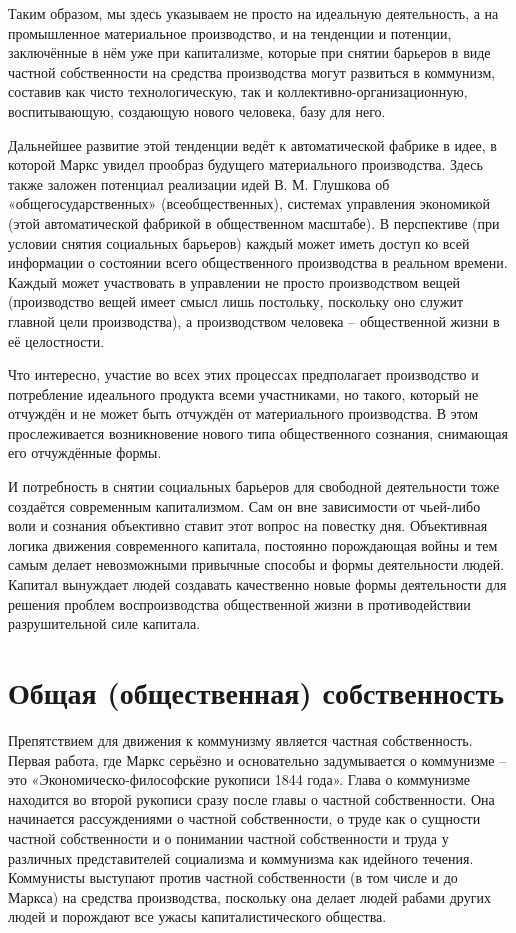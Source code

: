 \documentclass[12pt,a4paper,openany]{book}
\begin{document}
Таким образом, мы здесь указываем не просто на идеальную деятельность, а на промышленное материальное производство, и на тенденции и потенции, заключённые в нём уже при капитализме, которые при снятии барьеров в виде частной собственности на средства производства могут развиться в коммунизм, составив как чисто технологическую, так и коллективно-организационную, воспитывающую, создающую нового человека, базу для него.

Дальнейшее развитие этой тенденции ведёт к автоматической фабрике в идее, в которой Маркс увидел прообраз будущего материального производства. Здесь также заложен потенциал реализации идей В. М. Глушкова об «общегосударственных» (всеобщественных), системах управления экономикой (этой автоматической фабрикой в общественном масштабе). В перспективе (при условии снятия социальных барьеров) каждый может иметь доступ ко всей информации о состоянии всего общественного производства в реальном времени. Каждый может участвовать в управлении не просто производством вещей (производство вещей имеет смысл лишь постольку, поскольку оно служит главной цели производства), а производством человека – общественной жизни в её целостности.

Что интересно, участие во всех этих процессах предполагает производство и потребление идеального продукта всеми участниками, но такого, который не отчуждён и не может быть отчуждён от материального производства. В этом прослеживается возникновение нового типа общественного сознания, снимающая его отчуждённые формы.

И потребность в снятии социальных барьеров для свободной деятельности тоже создаётся современным капитализмом. Сам он вне зависимости от чьей-либо воли и сознания объективно ставит этот вопрос на повестку дня. Объективная логика движения современного капитала, постоянно порождающая войны и тем самым делает невозможными привычные способы и формы деятельности людей. Капитал вынуждает людей создавать качественно новые формы деятельности для решения проблем воспроизводства общественной жизни в противодействии разрушительной силе капитала.
\ifSubfilesClassLoaded{\setcounter{page}{27}}{}
\section{Общая (общественная) собственность}
\label{sec:05_obshhaya_sobstvennost}

Препятствием для движения к коммунизму является частная собственность. Первая работа, где Маркс серьёзно и основательно задумывается о коммунизме – это «Экономическо-философские рукописи 1844 года». Глава о коммунизме находится во второй рукописи сразу после главы о частной собственности. Она начинается рассуждениями о частной собственности, о труде как о сущности частной собственности и о понимании частной собственности и труда у различных представителей социализма и коммунизма как идейного течения. Коммунисты выступают против частной собственности (в том числе и до Маркса) на средства производства, поскольку она делает людей рабами других людей и порождают все ужасы капиталистического общества.
\end{document}
